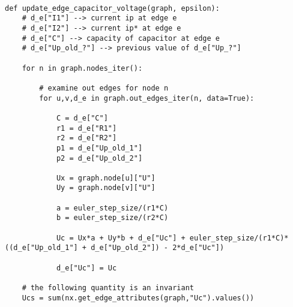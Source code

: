 \begin{codesnippet}
\begin{verbatim}

def update_edge_capacitor_voltage(graph, epsilon):
	# d_e["I1"] --> current ip at edge e
	# d_e["I2"] --> current ip* at edge e
	# d_e["C"] --> capacity of capacitor at edge e
	# d_e["Up_old_?"] --> previous value of d_e["Up_?"]
	
	for n in graph.nodes_iter():

		# examine out edges for node n
		for u,v,d_e in graph.out_edges_iter(n, data=True):

			C = d_e["C"]
			r1 = d_e["R1"]
			r2 = d_e["R2"]
			p1 = d_e["Up_old_1"]
			p2 = d_e["Up_old_2"]
						
			Ux = graph.node[u]["U"]
			Uy = graph.node[v]["U"]

			a = euler_step_size/(r1*C)
			b = euler_step_size/(r2*C)
			
			Uc = Ux*a + Uy*b + d_e["Uc"] + euler_step_size/(r1*C)*((d_e["Up_old_1"] + d_e["Up_old_2"]) - 2*d_e["Uc"]) 

			d_e["Uc"] = Uc

	# the following quantity is an invariant
	Ucs = sum(nx.get_edge_attributes(graph,"Uc").values())		
\end{verbatim}

\label{code:capacitor_voltage}
\end{codesnippet}
